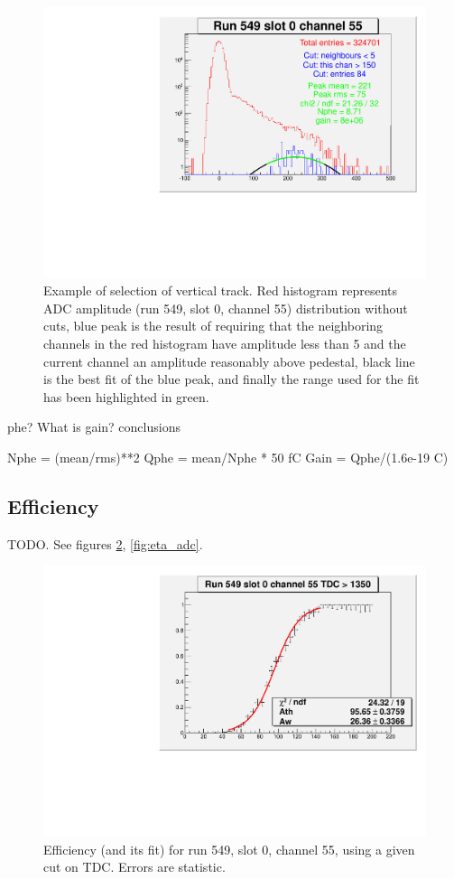 \documentclass{article}
\begin{document}
\begin{figure}[htbp]
\includegraphics[width=\textwidth]{run_549_peak_55}
\caption{Example of selection of vertical track. Red histogram represents ADC amplitude (run 549, slot 0, channel 55) distribution without cuts, blue peak is the result of requiring that the neighboring channels in the red histogram have amplitude less than 5 and the current channel an amplitude reasonably above pedestal, black line is the best fit of the blue peak, and finally the range used for the fit has been highlighted in green.}
\label{fig:peak}
\end{figure}

phe? What is gain? conclusions

Nphe = (mean/rms)**2
Qphe = mean/Nphe * 50 fC
Gain = Qphe/(1.6e-19 C)

\subsection{Efficiency}\label{sec:eta}
TODO.
See figures \ref{fig:eta_fit}, \ref{fig:eta_adc}.

\begin{figure}[htbp]
\includegraphics[width=\textwidth]{run_549_eta_55}
\caption{Efficiency (and its fit) for run 549, slot 0, channel 55, using a given cut on TDC. Errors are statistic.}
\label{fig:eta_fit}
\end{figure}
\end{document}
